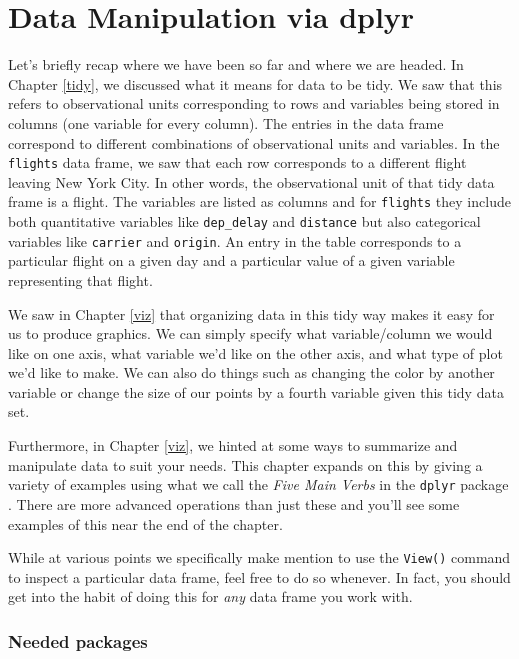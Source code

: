 \documentclass[]{tufte-book}
\theoremstyle{definition}
\theoremstyle{definition}
\theoremstyle{remark}
\begin{document}
\chapter{Data Manipulation via dplyr}\label{manip}

Let's briefly recap where we have been so far and where we are headed.
In Chapter \ref{tidy}, we discussed what it means for data to be tidy.
We saw that this refers to observational units corresponding to rows and
variables being stored in columns (one variable for every column). The
entries in the data frame correspond to different combinations of
observational units and variables. In the \texttt{flights} data frame,
we saw that each row corresponds to a different flight leaving New York
City. In other words, the observational unit of that tidy data frame is
a flight. The variables are listed as columns and for \texttt{flights}
they include both quantitative variables like \texttt{dep\_delay} and
\texttt{distance} but also categorical variables like \texttt{carrier}
and \texttt{origin}. An entry in the table corresponds to a particular
flight on a given day and a particular value of a given variable
representing that flight.

We saw in Chapter \ref{viz} that organizing data in this tidy way makes
it easy for us to produce graphics. We can simply specify what
variable/column we would like on one axis, what variable we'd like on
the other axis, and what type of plot we'd like to make. We can also do
things such as changing the color by another variable or change the size
of our points by a fourth variable given this tidy data set.

Furthermore, in Chapter \ref{viz}, we hinted at some ways to summarize
and manipulate data to suit your needs. This chapter expands on this by
giving a variety of examples using what we call the \emph{Five Main
Verbs} in the \texttt{dplyr} package \citep{R-dplyr}. There are more
advanced operations than just these and you'll see some examples of this
near the end of the chapter.

While at various points we specifically make mention to use the
\texttt{View()} command to inspect a particular data frame, feel free to
do so whenever. In fact, you should get into the habit of doing this for
\emph{any} data frame you work with.

\subsection*{Needed packages}\label{needed-packages-2}
\end{document}
